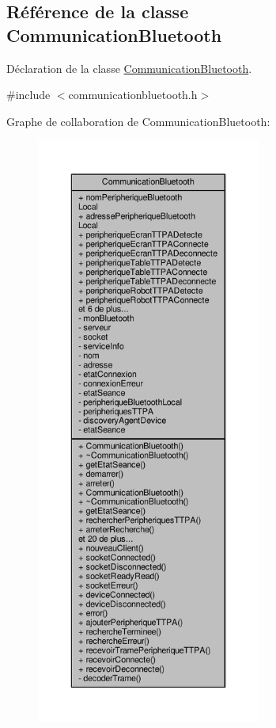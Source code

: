 \hypertarget{class_communication_bluetooth}{}\subsection{Référence de la classe Communication\+Bluetooth}
\label{class_communication_bluetooth}


Déclaration de la classe \hyperlink{class_communication_bluetooth}{Communication\+Bluetooth}.  




{\ttfamily \#include $<$communicationbluetooth.\+h$>$}



Graphe de collaboration de Communication\+Bluetooth\+:\nopagebreak
\begin{figure}[H]
\begin{center}
\leavevmode
\includegraphics[height=550pt]{class_communication_bluetooth__coll__graph}
\end{center}
\end{figure}
